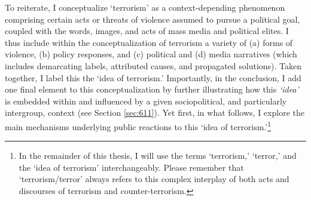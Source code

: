 To reiterate, I conceptualize `terrorism' as a context-depending phenomenon comprising certain acts or threats of violence assumed to pursue a political goal, coupled with the words, images, and acts of mass media and political elites. I thus include within the conceptualization of terrorism a variety of (a) forms of violence, (b) policy responses, and (c) political and (d) media narratives (which includes demarcating labels, attributed causes, and propagated solutions). Taken together, I label this the `idea of terrorism.' Importantly, in the conclusion, I add one final element to this conceptualization by further illustrating how this \textit{`idea'} is embedded within and influenced by a given sociopolitical, and particularly intergroup, context (see Section \ref{sec:611}). Yet first, in what follows, I explore the main mechanisms underlying public reactions to this `idea of terrorism.'\footnote{In the remainder of this thesis, I will use the terms `terrorism,' `terror,' and the `idea of terrorism' interchangeably. Please remember that `terrorism/terror' always refers to this complex interplay of both acts and discourses of terrorism and counter-terrorism.}


